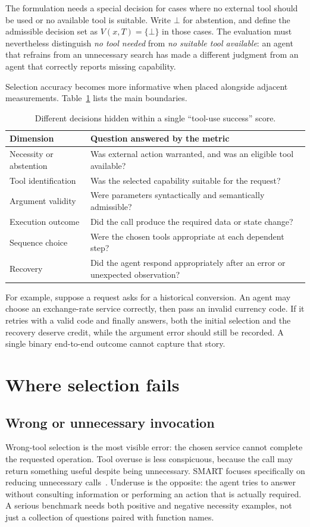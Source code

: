 \documentclass[10pt,a4paper]{article}
\begin{document}
The formulation needs a special decision for cases where no external tool should be used or no available tool is suitable. Write $\bot$ for abstention, and define the admissible decision set as $V(x,T)=\{\bot\}$ in those cases. The evaluation must nevertheless distinguish \emph{no tool needed} from \emph{no suitable tool available}: an agent that refrains from an unnecessary search has made a different judgment from an agent that correctly reports missing capability.

Selection accuracy becomes more informative when placed alongside adjacent measurements. Table~\ref{tab:dimensions} lists the main boundaries.
\begin{table}[ht]
\centering\small
\caption{Different decisions hidden within a single ``tool-use success'' score.}\label{tab:dimensions}
\begin{tabularx}{\linewidth}{@{}p{.29\linewidth}X@{}}
\toprule
Dimension & Question answered by the metric\\\midrule
Necessity or abstention & Was external action warranted, and was an eligible tool available?\\
Tool identification & Was the selected capability suitable for the request?\\
Argument validity & Were parameters syntactically and semantically admissible?\\
Execution outcome & Did the call produce the required data or state change?\\
Sequence choice & Were the chosen tools appropriate at each dependent step?\\
Recovery & Did the agent respond appropriately after an error or unexpected observation?\\\bottomrule
\end{tabularx}
\end{table}

For example, suppose a request asks for a historical conversion. An agent may choose an exchange-rate service correctly, then pass an invalid currency code. If it retries with a valid code and finally answers, both the initial selection and the recovery deserve credit, while the argument error should still be recorded. A single binary end-to-end outcome cannot capture that story.

\section{Where selection fails}
\subsection{Wrong or unnecessary invocation}
Wrong-tool selection is the most visible error: the chosen service cannot complete the requested operation. Tool overuse is less conspicuous, because the call may return something useful despite being unnecessary. SMART focuses specifically on reducing unnecessary calls~\cite{smart}. Underuse is the opposite: the agent tries to answer without consulting information or performing an action that is actually required. A serious benchmark needs both positive and negative necessity examples, not just a collection of questions paired with function names.
\end{document}

